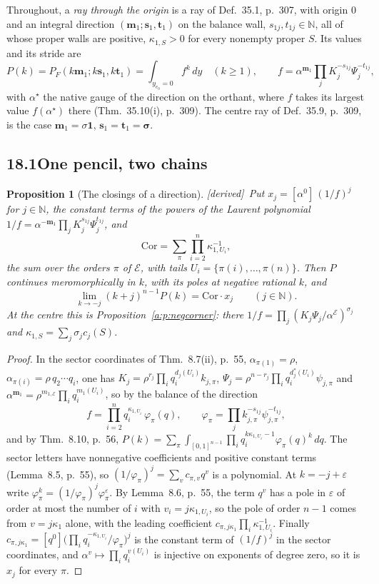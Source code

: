 \documentclass[11pt]{article}
\newcommand{\cE}{\mathcal E}
\newcommand{\one}{\mathbf 1}
\newcommand{\mvec}{\mathbf m}
\theoremstyle{plain}
\newtheorem{proposition}{Proposition}[section]
\theoremstyle{definition}
\theoremstyle{remark}
\newcommand{\derived}{\textup{[derived]}}
\begin{document}
Throughout, a \emph{ray through the origin} is a ray of Def.~35.1, p.~307, with origin $0$ and an integral direction $(\mvec_1;\mathbf s_1,\mathbf t_1)$ on the balance wall, $s_{1j},t_{1j}\in\mathbb N$, all of whose proper walls are positive, $\kappa_{1,S}>0$ for every nonempty proper $S$. Its values and its stride are
\[
P(k)=P_F(k\mvec_1;k\mathbf s_1,k\mathbf t_1)=\int_{y_{e_0}=0}f^k\,dy\quad(k\ge1),\qquad f=\alpha^{\mvec_1}\prod_jK_j^{-s_{1j}}\Psi_j^{-t_{1j}},
\]
with $\alpha^\star$ the native gauge of the direction on the orthant, where $f$ takes its largest value $f(\alpha^\star)$ there (Thm.~35.10(i), p.~309). The centre ray of Def.~35.9, p.~309, is the case $\mvec_1=\sigma\one$, $\mathbf s_1=\mathbf t_1=\boldsymbol\sigma$.

\subsection*{18.1\quad One pencil, two chains}

\begin{proposition}[The closings of a direction]\label{a:p:dirclose}\derived\
Put $x_j=[\alpha^0]\,(1/f)^j$ for $j\in\mathbb N$, the constant terms of the powers of the Laurent polynomial $1/f=\alpha^{-\mvec_1}\prod_jK_j^{s_{1j}}\Psi_j^{t_{1j}}$, and
\[
\mathrm{Cor}=\sum_\pi\prod_{i=2}^n\kappa_{1,U_i}^{-1},
\]
the sum over the orders $\pi$ of $\cE$, with tails $U_i=\{\pi(i),\dots,\pi(n)\}$. Then $P$ continues meromorphically in $k$, with its poles at negative rational $k$, and
\[
\lim_{k\to-j}(k+j)^{n-1}P(k)=\mathrm{Cor}\cdot x_j\qquad(j\in\mathbb N).
\]
At the centre this is Proposition~\ref{a:p:negcorner}: there $1/f=\prod_j(K_j\Psi_j/\alpha^{\cE})^{\sigma_j}$ and $\kappa_{1,S}=\sum_j\sigma_jc_j(S)$.
\end{proposition}

\begin{proof}
In the sector coordinates of Thm.~8.7(ii), p.~55, $\alpha_{\pi(1)}=\rho$, $\alpha_{\pi(i)}=\rho\,q_2\cdots q_i$, one has $K_j=\rho^{r_j}\prod_iq_i^{d_j(U_i)}k_{j,\pi}$, $\Psi_j=\rho^{n-r_j}\prod_iq_i^{d^\ast_j(U_i)}\psi_{j,\pi}$ and $\alpha^{\mvec_1}=\rho^{m_{1,\cE}}\prod_iq_i^{m_1(U_i)}$, so by the balance of the direction
\[
f=\prod_{i=2}^nq_i^{\kappa_{1,U_i}}\,\varphi_\pi(q),\qquad \varphi_\pi=\prod_jk_{j,\pi}^{-s_{1j}}\psi_{j,\pi}^{-t_{1j}},
\]
and by Thm.~8.10, p.~56, $P(k)=\sum_\pi\int_{[0,1]^{n-1}}\prod_iq_i^{k\kappa_{1,U_i}-1}\varphi_\pi(q)^k\,dq$. The sector letters have nonnegative coefficients and positive constant terms (Lemma~8.5, p.~55), so $(1/\varphi_\pi)^j=\sum_vc_{\pi,v}q^v$ is a polynomial. At $k=-j+\varepsilon$ write $\varphi_\pi^{k}=(1/\varphi_\pi)^j\varphi_\pi^{\varepsilon}$. By Lemma~8.6, p.~55, the term $q^v$ has a pole in $\varepsilon$ of order at most the number of $i$ with $v_i=j\kappa_{1,U_i}$, so the pole of order $n-1$ comes from $v=j\kappa_1$ alone, with the leading coefficient $c_{\pi,j\kappa_1}\prod_i\kappa_{1,U_i}^{-1}$. Finally $c_{\pi,j\kappa_1}=[q^0]\big(\prod_iq_i^{-\kappa_{1,U_i}}/\varphi_\pi\big)^j$ is the constant term of $(1/f)^j$ in the sector coordinates, and $\alpha^v\mapsto\prod_iq_i^{v(U_i)}$ is injective on exponents of degree zero, so it is $x_j$ for every $\pi$.
\end{proof}
\end{document}

